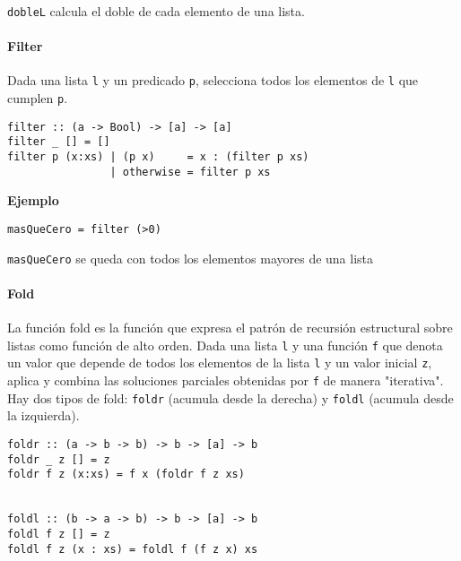 \documentclass[10pt,a4paper]{article}
\begin{document}
\texttt{dobleL} calcula el doble de cada elemento de una lista.

\paragraph{Filter}
Dada una lista \texttt{l} y un predicado \texttt{p}, selecciona todos los elementos de \texttt{l} que cumplen \texttt{p}.

\begin{centrado}
	\begin{verbatim}
filter :: (a -> Bool) -> [a] -> [a]
filter _ [] = []
filter p (x:xs) | (p x)     = x : (filter p xs)
                | otherwise = filter p xs  
	\end{verbatim}
\end{centrado}

\textbf{Ejemplo}
\begin{centrado}
	\begin{verbatim}
masQueCero = filter (>0)
	\end{verbatim}
\end{centrado}

\texttt{masQueCero} se queda con todos los elementos mayores de una lista

\paragraph{Fold}
La función {fold} es la función que expresa el patrón de recursión estructural sobre listas como función de alto orden. Dada una lista \texttt{l} y una función \texttt{f} que denota un valor que depende de todos los elementos de la lista \texttt{l} y un valor inicial \texttt{z}, aplica y combina las soluciones parciales obtenidas por \texttt{f} de manera "iterativa". 
Hay dos tipos de fold: \texttt{foldr} (acumula desde la derecha) y \texttt{foldl} (acumula desde la izquierda).

\begin{centrado}
	\begin{verbatim}
foldr :: (a -> b -> b) -> b -> [a] -> b
foldr _ z [] = z
foldr f z (x:xs) = f x (foldr f z xs)
		
		
foldl :: (b -> a -> b) -> b -> [a] -> b
foldl f z [] = z
foldl f z (x : xs) = foldl f (f z x) xs
\end{verbatim}
\end{centrado}
\end{document}
